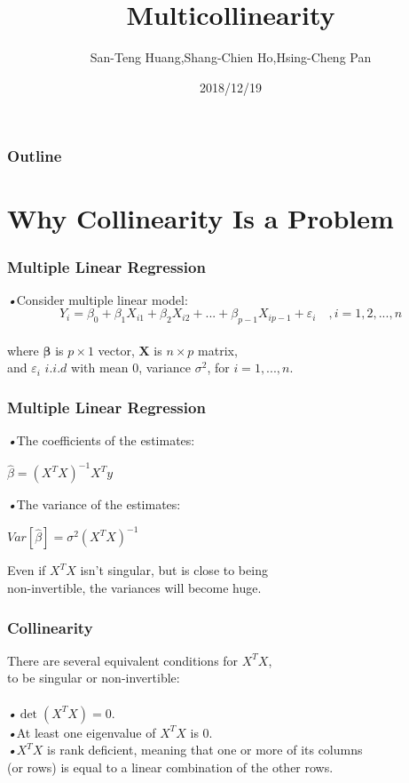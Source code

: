 \documentclass{beamer}
\title{Multicollinearity}
\author{San-Teng Huang,Shang-Chien Ho,Hsing-Cheng Pan}
\institute{National Dong Hwa University}
\date{2018/12/19}
\begin{document}
		
		\begin{frame}
		\titlepage
		\end{frame}

\begin{frame}
\frametitle{Outline} %
\tableofcontents %
\end{frame}


\section{Why Collinearity Is a Problem}

\begin{frame}
\frametitle{Multiple Linear Regression}
\emph{•}Consider multiple linear model: 
\begin{equation}
Y_i =  \beta_0 + \beta_1 X_{i1} +\beta_2 X_{i2} +...+\beta_{p-1} X_{ip-1}  + \varepsilon_i \quad , i=1,2,...,n
\end{equation} 
\\\quad where $\boldsymbol{\beta}$ is $p \times 1$ vector, $\mathbf{X}$ is $n \times p$ matrix,
\\\quad and $\varepsilon_i \,\, i.i.d$ with mean $0$, variance $\sigma^2$, for $i=1,...,n$.

\end{frame}


\begin{frame}
\frametitle{Multiple Linear Regression}
\emph{•}The  coefficients of the estimates:
\begin{center}
$\hat{\beta}={\left( X^{T} X\right)}^{-1}X^{T} y$
\end{center}
\emph{•}The variance of the estimates:
\begin{center}
$Var \left[ \hat{\beta}\right] ={\sigma}^2 {\left( X^{T} X\right)}^{-1}$
\end{center}
\quad Even if $X^{T} X$ isn't singular, but is close to being
\\\quad non-invertible, the variances will become huge.
\end{frame}

\begin{frame}
\frametitle{Collinearity}
There are several equivalent conditions for $X^{T} X$,
\\ to be singular or non-invertible:
\\\mbox{}
\\\emph{•}$\det(X^{T} X) = 0$.
\\\emph{•}At least one eigenvalue of $X^{T} X$ is 0. 
\\\emph{•}$X^{T} X$ is rank deﬁcient, meaning that one or more of its columns
\\\quad (or rows) is equal to a linear combination of the other rows.
\end{frame}
\end{document}
